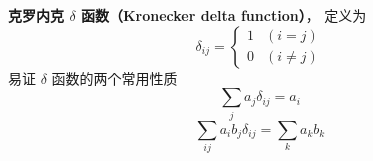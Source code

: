 
\begin{issues}
\end{issues}


\textbf{克罗内克 $\delta$ 函数（Kronecker delta function）}， 定义为
\begin{equation}\label{Kronec_eq2}
\delta_{ij} =
\begin{cases}
1 & (i = j)\\
0 & (i \ne j)
\end{cases}
\end{equation}
易证 $\delta$ 函数的两个常用性质
\begin{equation}\label{Kronec_eq1}
\sum_j a_j \delta_{ij} = a_i
\end{equation}
\begin{equation}
\sum_{ij} a_i b_j \delta_{ij} = \sum_k a_k b_k
\end{equation}
